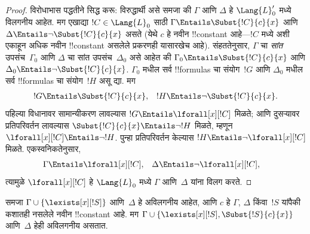 \documentclass[../../../include/open-logic-section]{subfiles}
\begin{document}
\begin{proof}
विरोधाभास पद्धतीने सिद्ध करू: विरुद्धार्थी असे समजा की $\Gamma$ आणि
$\Delta$ हे $\Lang{L}'_0$ मध्ये विलगनीय आहेत. मग एखाद्या $!C \in
\Lang{L}_0$ साठी $\Gamma \Entails \Subst{!C}{c}{x}$ आणि $\Delta
\Entails \lnot \Subst{!C}{c}{x}$ असते (येथे $c$ हे नवीन !!{constant}
आहे---$!C$ मध्ये अशी एकाहून अधिक नवीन !!{constant} असलेले प्रकरणही यासारखेच
आहे). संहततेनुसार, $\Gamma$ चा \emph{सांत} उपसंच~$\Gamma_0$ आणि
$\Delta$ चा सांत उपसंच~$\Delta_0$ असे आहेत की $\Gamma_0 \Entails
\Subst{!C}{c}{x}$ आणि $\Delta_0 \Entails \lnot \Subst{!C}{c}{x}$.
$\Gamma_0$ मधील सर्व !!{formula}s चा संयोग~$!G$ आणि $\Delta_0$ मधील सर्व
!!{formula}s चा संयोग~$!H$ असू द्या. मग
\begin{align*}
  !G & \Entails \Subst{!C}{c}{x}, & !H  \Entails \lnot \Subst{!C}{c}{x}.
\end{align*}
पहिल्या विधानावर सामान्यीकरण लावल्यास $!G \Entails \lforall[x][!C]$
मिळते; आणि दुसऱ्यावर प्रतिपरिवर्तन लावल्यास $\Subst{!C}{c}{x}
\Entails \lnot !H$ मिळते, म्हणून $\lforall[x][!C] \Entails \lnot !H$.
पुन्हा प्रतिपरिवर्तन केल्यास $!H \Entails \lnot \lforall[x][!C]$
मिळते. एकस्वनिकतेनुसार,
\begin{align*}
  \Gamma &\Entails \lforall[x][!C], &
  \Delta & \Entails \lnot \lforall[x][!C],
\end{align*}
त्यामुळे $\lforall[x][!C]$ हे $\Lang{L}_0$ मध्ये $\Gamma$ आणि~$\Delta$
यांना विलग करते.
\end{proof}

\begin{lem}
समजा $\Gamma \cup \{ \lexists[x][!S] \}$ आणि~$\Delta$ हे अविलगनीय
आहेत, आणि $c$ हे $\Gamma$, $\Delta$ किंवा~$!S$ यांपैकी कशातही नसलेले नवीन
!!{constant} आहे. मग $\Gamma \cup \{ \lexists[x][!S],
\Subst{!S}{c}{x} \}$ आणि~$\Delta$ हेही अविलगनीय असतात.
\end{lem}
\end{document}
